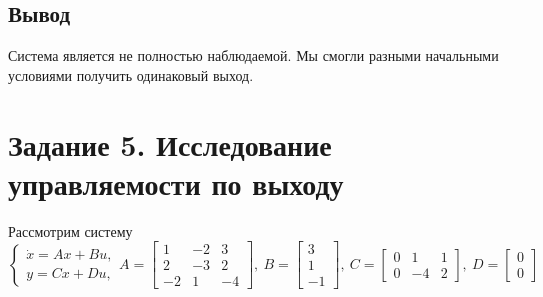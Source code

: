 \documentclass[a4paper, 12pt]{article}
\begin{document}
    \subsection{Вывод}
    Система является не полностью наблюдаемой. Мы смогли разными начальными условиями получить одинаковый выход.


    \section{Задание 5. Исследование управляемости по выходу}
    Рассмотрим систему
    $$
    \begin{cases}
        \dot{x}=Ax+Bu,\\
        y=Cx+Du,
    \end{cases} A=\begin{bmatrix}
        1 &-2 &3\\
        2 &-3 &2\\
        -2 &1 &-4
    \end{bmatrix},\ B=\begin{bmatrix}
        3\\
        1\\
        -1
    \end{bmatrix},\ C=\begin{bmatrix}
        0 &1 &1\\
        0 &-4 &2
    \end{bmatrix},\ D=\begin{bmatrix}
        0\\ 0
    \end{bmatrix}
    $$
\end{document}
